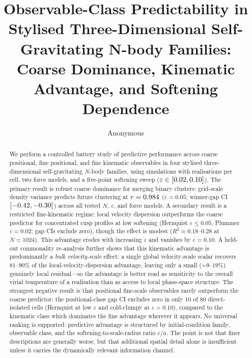 \documentclass[twocolumn,linenumbers]{aastex701}
\newcommand{\heps}{\varepsilon}
\begin{document}
\title{Observable-Class Predictability in Stylised
       Three-Dimensional Self-Gravitating N-body Families:
       Coarse Dominance, Kinematic Advantage,
       and Softening Dependence}

\author{Anonymous}

\begin{abstract}
We perform a controlled battery study of predictive performance across
coarse positional, fine positional, and fine kinematic observables in
four stylised three-dimensional self-gravitating $N$-body families,
using \TotalRuns{} simulations with \NReplicates{} realisations per
cell, two force models, and a five-point softening sweep
($\heps \in [\EpsMin{}, \EpsMax{}]$).
The primary result is robust coarse dominance for merging binary
clusters: grid-scale density variance predicts future clustering at
$r = 0.984{}$ ($\heps = 0.05$; winner-gap CI
$[-0.42{}, -0.30{}]$) across all
tested $N$, $\heps$, and force models.
A secondary result is a restricted fine-kinematic regime: local
velocity dispersion outperforms the coarse predictor for concentrated
cusp profiles at low softening (Hernquist $\heps \le 0.05$, Plummer
$\heps = 0.02$; gap CIs exclude zero), though the effect is modest
($R^2 \approx 0.18$--$0.28$ at $N = 1024$).
This advantage erodes with increasing $\heps$ and vanishes by
$\heps = 0.10$.
A held-out commonality re-analysis further shows that this kinematic
advantage is predominantly a \emph{bulk velocity-scale} effect: a single
global velocity-scale scalar recovers $81$--$90\%$ of the
local-velocity-dispersion advantage, leaving only a small
($\sim$$9$--$19\%$) genuinely local residual---so the advantage is better
read as sensitivity to the overall virial temperature of a realisation
than as access to local phase-space structure.
The strongest negative result is that positional fine-scale
observables rarely outperform the coarse predictor: the positional-class
gap CI excludes zero in only 10 of 80 direct-isolated cells (Hernquist
at low $\heps$ and cold-clumpy at $\heps = 0.10$), compared to the
kinematic class which dominates the fine advantage wherever it appears.
No universal ranking is supported: predictive advantage is structured
by initial-condition family, observable class, and the
softening-to-scale-radius ratio $\heps/a$.
The point is not that finer descriptions are generally worse, but
that additional spatial detail alone is insufficient unless it carries
the dynamically relevant information channel.
\end{abstract}
\end{document}
